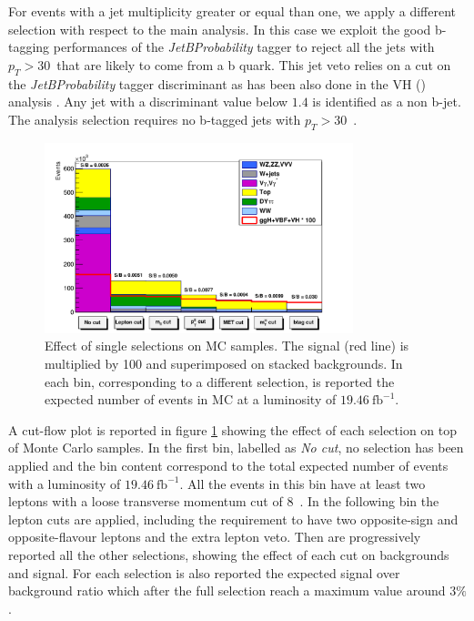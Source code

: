 \begin{itemize}
For events with a jet multiplicity greater or equal than one, we apply a different selection with respect to the main analysis. In this case we exploit the good b-tagging performances of the \textit{JetBProbability} tagger to reject all the jets with $p_T > 30$~\GeV that are likely to come from a b quark. This jet veto relies on a cut on the \textit{JetBProbability} tagger discriminant as has been also done in the VH (\hwwllnn) analysis \cite{CMS_PAS_HIG_13-017}. Any jet with a discriminant value below $1.4$ is identified as a non b-jet. The analysis selection requires no b-tagged jets with $p_T > 30$~\GeV.

\begin{figure}[b]
\centering
\includegraphics[width=0.8\textwidth]{images/cutflow2.pdf}
\caption{Effect of single selections on MC samples. The signal (red line) is multiplied by 100 and superimposed on stacked backgrounds. In each bin, corresponding to a different selection, is reported the expected number of events in MC at a luminosity of $19.46~\mathrm{fb}^{-1}$.\label{fig:cutflow}}
\end{figure}

A  cut-flow plot is reported in figure \ref{fig:cutflow} showing the effect of each selection on top of Monte Carlo samples. In the first bin, labelled as \textit{No cut}, no selection has been applied and the bin content correspond to the total expected number of events with a luminosity of $19.46~\mathrm{fb}^{-1}$. All the events in this bin have at least two leptons with a loose transverse momentum cut of $8$~\GeV. In the following bin the lepton cuts are applied, including the requirement to have two opposite-sign and opposite-flavour leptons and the extra lepton veto. Then are progressively reported all the other selections, showing the effect of each cut on backgrounds and signal. For each selection is also reported the expected signal over background ratio which after the full selection reach a maximum value around $3\%$.


\end{itemize}
